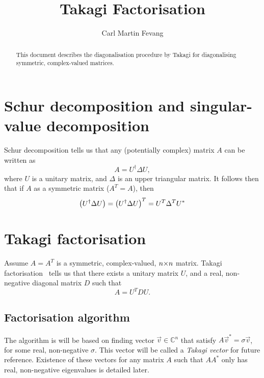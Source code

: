 \documentclass[english, notitlepage]{article}
\title{Takagi Factorisation}
\author{Carl Martin Fevang}
\begin{document}
\maketitle

\begin{abstract}
    This document describes the diagonalisation procedure by Takagi for diagonalising symmetric, complex-valued matrices.
\end{abstract}

\section{Schur decomposition and singular-value decomposition}
    Schur decomposition tells us that any (potentially complex) matrix \(A\) can be written as
    \[
        A = U^\dagger \Delta U,
    \]
    where \(U\) is a unitary matrix, and \(\Delta\) is an upper triangular matrix.
    It follows then that if \(A\) as a symmetric matrix (\(A^T = A\)), then
    \[
        \left(U^\dagger \Delta U\right) = \left(U^\dagger \Delta U\right)^T = U^T \Delta^T U^\ast
    \]

\section{Takagi factorisation}
    Assume \(A = A^T\) is a symmetric, complex-valued, \(n {\times} n\) matrix.
    Takagi factorisation~\autocite{Horn} tells us that there exists a unitary matrix \(U\), and a real, non-negative diagonal matrix \(D\) such that
    \begin{equation}
        \label{eq:takagi}
        A = U^T D U.
    \end{equation}

    \subsection{Factorisation algorithm}
        The algorithm is will be based on finding vector \(\vec{v} \in  \mathbb{C}^n\) that satisfy \(A \vec{v}^* = \sigma \vec{v}\), for some real, non-negative \(\sigma\).
        This vector will be called a \emph{Takagi vector} for future reference.
        Existence of these vectors for any matrix \(A\) such that \(AA^\ast\) only has real, non-negative eigenvalues is detailed later.
\end{document}
